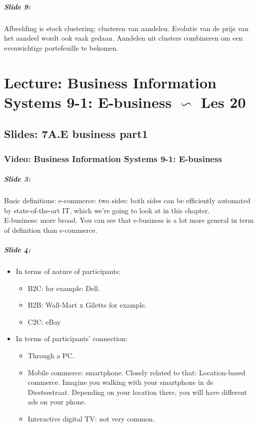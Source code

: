 \documentclass[10pt,a4paper]{report}
\begin{document}
\paragraph{Slide 9:}Afbeelding is stock clustering: clusteren van aandelen. Evolutie van de prijs van het aandeel wordt ook vaak gedaan. Aandelen uit clusters combineren om een evenwichtige portefeuille te bekomen.

\chapter{Lecture: Business Information Systems 9-1: E-business $\backsim$ Les 20}
\section{Slides: 7A.E business part1}
\subsection{Video: Business Information Systems 9-1: E-business}

\paragraph{Slide 3:} Basic definitions: e-commerce: two sides: both sides can be efficiently automated by state-of-the-art IT, which we're going to look at in this chapter.\\
E-business: more broad. You can see that e-business is a lot more general in term of definition than e-commerce.

\paragraph{Slide 4: }
\begin{itemize}
\item In terms of nature of participants:
\begin{itemize}
\item B2C: for example: Dell.
\item B2B: Wall-Mart x Gilette for example.
\item C2C: eBay
\end{itemize}
\item In terms of participants' connection:
\begin{itemize}
\item Through a PC.
\item Mobile commerce: smartphone. Closely related to that: Location-based commerce. Imagine you walking with your smartphone in de Diestsestraat. Depending on your location there, you will have different ads on your phone.
\item Interactive digital TV: not very common.
\end{itemize}
\end{itemize}
\end{document}
